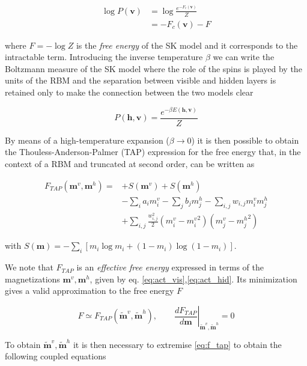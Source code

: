 \documentclass{revtex4-1}
\begin{document}
\begin{align}
\log P(\mathbf{v}) &= \log \frac{e^{-F_c(\mathbf{v})}}{Z} \\ \nonumber
&= -F_c(\mathbf{v}) - F
\end{align}

where \( \textstyle F = - \log Z \) is the \textit{free energy} of the SK model and it corresponds to the intractable term. Introducing the inverse temperature \(\beta\) we can write the Boltzmann measure of the SK model where the role of the spins is played by the units of the RBM and the separation between visible and hidden layers is retained only to make the connection between the two models clear

\begin{equation}
P(\textbf{h},\textbf{v}) = \frac{e^{- \beta E(\textbf{h},\textbf{v})}}{Z}
\end{equation}

By means of a high-temperature expansion (\(\beta \to 0\)) \cite{ht_exp} it is then possible to obtain the Thouless-Anderson-Palmer (TAP) expression for the free energy \cite{TAP} that, in the context of a RBM and truncated at second order, can be written as

\begin{align}
F_{TAP}(\mathbf{m}^v,\mathbf{m}^h) = &+ S(\mathbf{m}^v) + S(\mathbf{m}^h) \nonumber \\
&- \sum_i a_i m_i^v - \sum_j b_j m_j^h - \sum_{i,j} w_{i,j} m_i^v m_j^h \nonumber \\
&+ \sum_{i,j} \frac{w_{i,j}^2}{2} \left( m_i^v - {m_i^v}^2 \right) \left(m_j^v - {m_j^h}^2 \right) \label{eq:f_tap}
\end{align}

with \( \textstyle S(\mathbf{m}) = - \sum_i \left[ m_i \log m_i + (1 - m_i) \log (1 - m_i) \right] \).

We note that \(F_{TAP}\) is an \textit{effective free energy} expressed in terms of the magnetizations \(\mathbf{m}^v, \mathbf{m}^h\), given by eq. \eqref{eq:act_vis},\eqref{eq:act_hid}. Its minimization gives a valid approximation to the free energy \(F\)

\begin{equation}
F \simeq F_{TAP}(\mathbf{\tilde{m}}^v, \mathbf{\tilde{m}}^h), \qquad \left. \frac{dF_{TAP}}{d \mathbf{m}} \right\rvert_{\mathbf{\tilde{m}}^v, \mathbf{\tilde{m}}^h} = 0
\label{eq:f_approx}
\end{equation}

To obtain \(\mathbf{\tilde{m}}^v, \mathbf{\tilde{m}}^h\) it is then necessary to extremise \eqref{eq:f_tap} to obtain the following coupled equations
\end{document}

